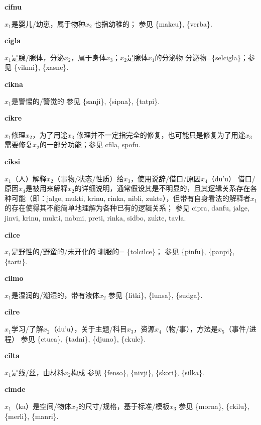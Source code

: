 \documentclass[notitlepage,twocolumn,a4paper,10pt]{book}
\begin{document}
{\sffamily\bfseries cifnu}\enspace {\ttfamily\bfseries[cif]}  $x_1$是婴儿\slash{}幼崽，属于物种$x_2$ \textemdash{} 也指幼稚的； 参见 \{makcu\}, \{verba\}.

{\sffamily\bfseries cigla}\enspace {\ttfamily\bfseries[cig]}  $x_1$是腺\slash{}腺体，分泌$x_2$，属于身体$x_3$；$x_2$是腺体$x_1$的分泌物 \textemdash{} 分泌物=\{selcigla\}；参见 \{vikmi\}, \{xasne\}.

{\sffamily\bfseries cikna}\enspace {\ttfamily\bfseries[cik]}  $x_1$是警惕的\slash{}警觉的 \textemdash{} 参见 \{sanji\}, \{sipna\}, \{tatpi\}.

{\sffamily\bfseries cikre} $x_1$修理$x_2$，为了用途$x_3$ \textemdash{} 修理并不一定指完全的修复，也可能只是修复为了用途$x_3$需要修复$x_2$的一部分功能；参见 {cfila}, {spofu}.

{\sffamily\bfseries ciksi}\enspace {\ttfamily\bfseries[    cki]}  $x_1$（人）解释$x_2$（事物\slash{}状态\slash{}性质）给$x_3$，使用说辞\slash{}借口\slash{}原因$x_4$（du'u） \textemdash{} 借口\slash{}原因$x_4$是被用来解释$x_2$的详细说明，通常假设其是不明显的，且其逻辑关系存在各种可能（即：jalge, mukti, krinu, rinka, nibli, zukte），但带有自身看法的解释者$x_1$的存在使得其不能简单地理解为各种已有的逻辑关系； 参见 {cipra}, {danfu}, {jalge}, {jinvi}, {krinu}, {mukti}, {nabmi}, {preti}, {rinka}, {sidbo}, {zukte}, {tavla}.

{\sffamily\bfseries cilce}\enspace {\ttfamily\bfseries[cic]}  $x_1$是野性的\slash{}野蛮的\slash{}未开化的 \textemdash{} 驯服的= \{tolcilce\}； 参见 \{pinfu\}, \{panpi\}, \{tarti\}.

{\sffamily\bfseries cilmo}\enspace {\ttfamily\bfseries[cim]}  $x_1$是湿润的\slash{}潮湿的，带有液体$x_2$ \textemdash{} 参见 \{litki\}, \{lunsa\}, \{sudga\}.

{\sffamily\bfseries cilre}\enspace {\ttfamily\bfseries[    cli]}  $x_1$学习\slash{}了解$x_2$（du'u），关于主题\slash{}科目$x_3$，资源$x_4$（物\slash{}事），方法是$x_5$（事件\slash{}进程） \textemdash{} 参见 \{ctuca\}, \{tadni\}, \{djuno\}, \{ckule\}.

{\sffamily\bfseries cilta}\enspace {\ttfamily\bfseries[cil]}  $x_1$是线\slash{}丝，由材料$x_2$构成 \textemdash{} 参见 \{fenso\}, \{nivji\}, \{skori\}, \{silka\}.

{\sffamily\bfseries cimde} $x_1$（ka）是空间\slash{}物体$x_2$的尺寸\slash{}规格，基于标准\slash{}模板$x_3$ \textemdash{} 参见 \{morna\}, \{ckilu\}, \{merli\}, \{manri\}.
\end{document}
